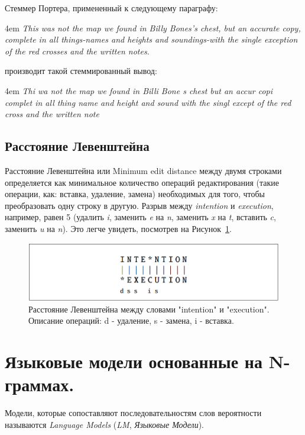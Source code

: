 \documentclass[a4paper,12pt,preview]{report} %
\begin{document}
	Стеммер Портера, примененный к следующему параграфу:
	
	\vspace{5mm}
	\begingroup
	\leftskip4em
	\rightskip\leftskip\textit{	This was not the map we found in Billy Bones's chest, but an accurate copy, complete in all things-names and heights and soundings-with the single exception of the red crosses and the written notes.}
	\vspace{5mm}
	\endgroup
	
	производит такой стеммированный вывод:
	
	\vspace{5mm}
	\begingroup
	\leftskip4em
	\rightskip\leftskip\textit{Thi wa not the map we found in Billi Bone s chest but an accur copi complet in all thing name and height and sound with the singl except of the red cross and the written note}
	\vspace{5mm}
	\endgroup
	
	
	\subsection{Расстояние Левенштейна}
	
	Расстояние Левенштейна \cite{7} или Minimum edit distance между двумя строками определяется как минимальное количество операций редактирования (такие операции, как: вставка, удаление,
	замена) необходимых для того, чтобы преобразовать одну строку в другую.
	Разрыв между \textit{intention} и \textit{execution}, например, равен 5 (удалить \textit{i}, заменить \textit{e} на \textit{n}, заменить \textit{x} на \textit{t}, вставить \textit{c}, заменить \textit{u} на \textit{n}). Это легче увидеть, посмотрев на Рисунок~\ref{fig:med}.
	
	
	\begin{figure}[H]
		\centering\includegraphics[scale=0.8]{MED.PNG}
		\caption{Расстояние Левенштейна между словами "intention" и "execution". \\ Описание операций: d - удаление, s - замена, i - вставка.}
		\label{fig:med}
	\end{figure}
	
	\section{Языковые модели основанные на N-граммах.}
	Модели, которые сопоставляют последовательностям слов вероятности называются \textit{Language Models} (\textit{LM}, \textit{Языковые Модели}).
	
\end{document}

